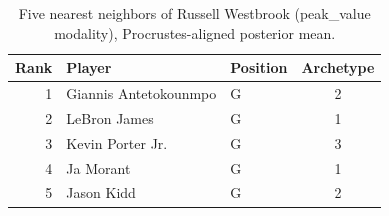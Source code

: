 \begin{table}[htbp]
  \centering\small
  \begin{tabular}{rllc}
    \toprule
    Rank & Player & Position & Archetype \\
    \midrule
    1 & Giannis Antetokounmpo & G & 2 \\
    2 & LeBron James & G & 1 \\
    3 & Kevin Porter Jr. & G & 3 \\
    4 & Ja Morant & G & 1 \\
    5 & Jason Kidd & G & 2 \\
    \bottomrule
  \end{tabular}
  \caption{Five nearest neighbors of Russell Westbrook (peak_value modality), Procrustes-aligned posterior mean.}
  \label{tab:Russell_Westbrook_neighbors_peak_value}
\end{table}

